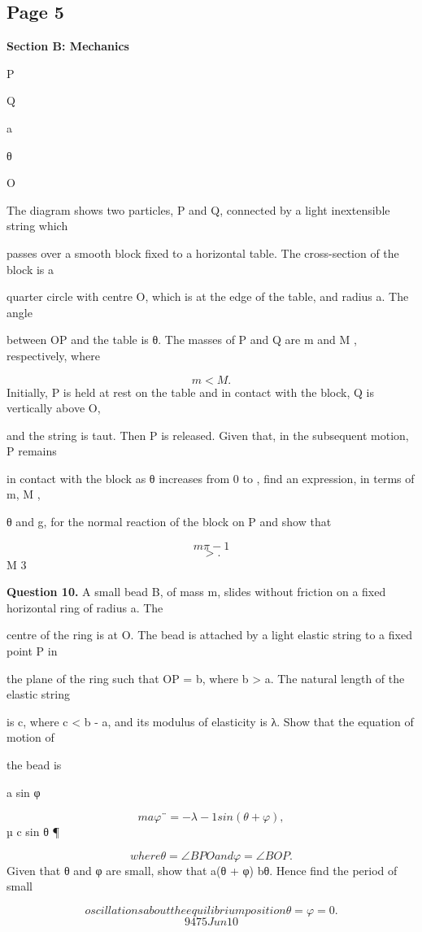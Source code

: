 \documentclass[12pt]{article}
\begin{document}
\subsection*{Page 5}
\begin{flushleft}
\bigskip\textbf{Section B: Mechanics}\par
P\par
Q\par
a\par
θ\par
O\par
The diagram shows two particles, P and Q, connected by a light inextensible string which\par
passes over a smooth block fixed to a horizontal table. The cross-section of the block is a\par
quarter circle with centre O, which is at the edge of the table, and radius a. The angle\par
between OP and the table is θ. The masses of P and Q are m and M , respectively, where\par
\[m < M .\]
Initially, P is held at rest on the table and in contact with the block, Q is vertically above O,\par
and the string is taut. Then P is released. Given that, in the subsequent motion, P remains\par
in contact with the block as θ increases from 0 to \pi, find an expression, in terms of m, M ,\par
θ and g, for the normal reaction of the block on P and show that\par
\[m \pi - 1\]
\[> .\]
M 3\par
\bigskip\textbf{Question 10.} A small bead B, of mass m, slides without friction on a fixed horizontal ring of radius a. The\par
centre of the ring is at O. The bead is attached by a light elastic string to a fixed point P in\par
the plane of the ring such that OP = b, where b > a. The natural length of the elastic string\par
is c, where c < b - a, and its modulus of elasticity is λ. Show that the equation of motion of\par
the bead is\par
a sin φ\par
\[maφ¨ = -λ - 1 sin(θ + φ) ,\]
µ c sin θ ¶\par
\[where θ = ∠BP O and φ = ∠BOP .\]
Given that θ and φ are small, show that a(θ + φ) \approx bθ. Hence find the period of small\par
\[oscillations about the equilibrium position θ = φ = 0.\]
\[9475 Jun10\]
\end{flushleft}
\end{document}
